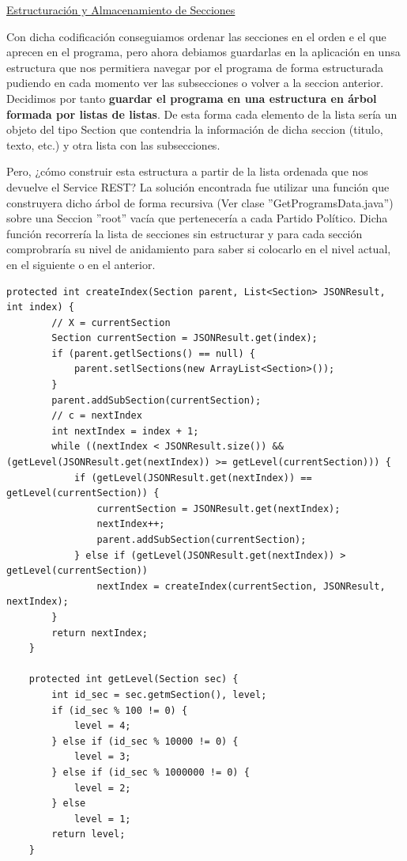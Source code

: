 	\underline{Estructuración y Almacenamiento de Secciones}
	
	Con dicha codificación conseguiamos ordenar las secciones en el orden e el que aprecen en el programa, pero ahora debiamos guardarlas en la aplicación en unsa estructura que nos permitiera navegar por el programa de forma estructurada pudiendo en cada momento ver las subsecciones o volver a la seccion anterior. Decidimos por tanto \textbf{guardar el programa en una estructura en árbol formada por listas de listas}. De esta forma cada elemento de la lista sería un objeto del tipo Section que contendria la información de dicha seccion (titulo, texto, etc.) y otra lista con las subsecciones.
	
	Pero, ¿cómo construir esta estructura a partir de la lista ordenada que nos devuelve el Service REST? La solución encontrada fue utilizar una función que construyera dicho árbol de forma recursiva (Ver clase ''GetProgramsData.java'') sobre una Seccion ''root'' vacía que pertenecería a cada Partido Político. Dicha función recorrería la lista de secciones sin estructurar y para cada sección comprobraría su nivel de anidamiento para saber si colocarlo en el nivel actual, en el siguiente o en el anterior.
	
	  \begin{lstlisting}[frame=single]	
	      protected int createIndex(Section parent, List<Section> JSONResult, int index) {
        // X = currentSection
        Section currentSection = JSONResult.get(index);
        if (parent.getlSections() == null) {
            parent.setlSections(new ArrayList<Section>());
        }
        parent.addSubSection(currentSection);
        // c = nextIndex
        int nextIndex = index + 1;
        while ((nextIndex < JSONResult.size()) && (getLevel(JSONResult.get(nextIndex)) >= getLevel(currentSection))) {
            if (getLevel(JSONResult.get(nextIndex)) == getLevel(currentSection)) {
                currentSection = JSONResult.get(nextIndex);
                nextIndex++;
                parent.addSubSection(currentSection);
            } else if (getLevel(JSONResult.get(nextIndex)) > getLevel(currentSection))
                nextIndex = createIndex(currentSection, JSONResult, nextIndex);
        }
        return nextIndex;
    }

    protected int getLevel(Section sec) {
        int id_sec = sec.getmSection(), level;
        if (id_sec % 100 != 0) {
            level = 4;
        } else if (id_sec % 10000 != 0) {
            level = 3;
        } else if (id_sec % 1000000 != 0) {
            level = 2;
        } else
            level = 1;
        return level;
    }	   
	  \end{lstlisting}
	  
